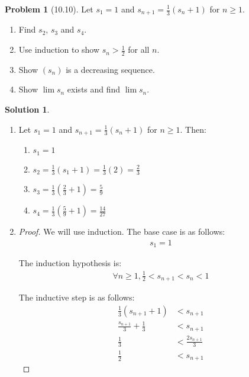 \documentclass[12pt]{article}
\theoremstyle{definition} %
\newtheorem{solution}{Solution}
\newtheorem{problem}{Problem}
\theoremstyle{plain} %
\begin{document}
\begin{problem}[10.10]
    Let $s_1 = 1$ and $s_{n+1} = \frac{1}{3}(s_n + 1)$ for $n \geq 1$. 
    \begin{enumerate}[label=(\alph*)]
        \item Find $s_2$, $s_3$ and $s_4$.
        \item Use induction to show $s_n > \frac{1}{2}$ for all $n$.
        \item Show $(s_n)$ is a decreasing sequence.
        \item Show $\lim s_n$ exists and find $\lim s_n$.
    \end{enumerate}
\end{problem}

\begin{solution}
    \begin{enumerate}
        \item Let $s_1 = 1$ and $s_{n+1} = \frac{1}{3}(s_n + 1)$ for $n \geq 1$. Then:
        \begin{enumerate}
            \item $s_1 = 1$
            \item $s_2 = \frac{1}{3}(s_1 + 1) = \frac{1}{3}(2) = \frac{2}{3}$
            \item $s_3 = \frac{1}{3} \left( \frac{2}{3} + 1 \right) = \frac{5}{9}$
            \item $s_4 = \frac{1}{3} \left( \frac{5}{9} + 1 \right) = \frac{14}{27}$
        \end{enumerate}
        \item \begin{proof}
            We will use induction. The base case is as follows:
            \begin{align}
            s_1 = 1 \tag{53}
            \end{align}
        
            The induction hypothesis is:
            \begin{align}
            \forall n \geq 1, \frac{1}{2} < s_{n+1} < s_n < 1 \tag{54}
            \end{align}
        
            The inductive step is as follows:
            \begin{align}
                \frac{1}{3}(s_{n+1} + 1) &< s_{n+1} \tag{55} \\
                \frac{s_{n+1}}{3} + \frac{1}{3} &< s_{n+1} \tag{56} \\
                \frac{1}{3} &< \frac{2s_{n+1}}{3} \tag{57} \\
                \frac{1}{2} &< s_{n+1} \tag{58}
            \end{align}
        

\end{proof}
\end{enumerate}
\end{solution}
\end{document}
